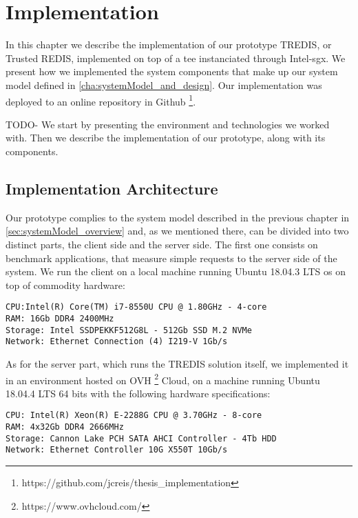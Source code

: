 \chapter{Implementation}
\label{cha:implementation}

In this chapter we describe the implementation of our prototype TREDIS, or Trusted REDIS, implemented on top of a \gls{tee} instanciated through Intel-\gls{sgx}. 
We present how we implemented the system components that make up our system model defined in \ref{cha:systemModel_and_design}.
Our implementation was deployed to an online repository in Github \footnote{https://github.com/jcreis/thesis\_implementation}.

TODO- We start by presenting the environment and technologies we worked with. Then we describe the implementation of our prototype, along with its components.


\section{Implementation Architecture}

Our prototype complies to the system model described in the previous chapter in \ref{sec:systemModel_overview} and, as we mentioned there, can be divided into two distinct parts, the client side and the server side.
The first one consists on benchmark applications, that measure simple requests to the server side of the system. We run the client on a local machine running Ubuntu 18.04.3 LTS \gls{os} on top of commodity hardware:
\vspace{5mm}
\begin{lstlisting}
CPU:Intel(R) Core(TM) i7-8550U CPU @ 1.80GHz - 4-core
RAM: 16Gb DDR4 2400MHz
Storage: Intel SSDPEKKF512G8L - 512Gb SSD M.2 NVMe
Network: Ethernet Connection (4) I219-V 1Gb/s
\end{lstlisting} 
\vspace{3mm}

As for the server part, which runs the TREDIS solution itself, we implemented it in an environment hosted on OVH \footnote{https://www.ovhcloud.com/} Cloud, on a machine running Ubuntu 18.04.4 LTS 64 bits with the following hardware specifications: 
\vspace{5mm}
\begin{lstlisting}
CPU: Intel(R) Xeon(R) E-2288G CPU @ 3.70GHz - 8-core
RAM: 4x32Gb DDR4 2666MHz 
Storage: Cannon Lake PCH SATA AHCI Controller - 4Tb HDD
Network: Ethernet Controller 10G X550T 10Gb/s
\end{lstlisting}
\vspace{3mm}


